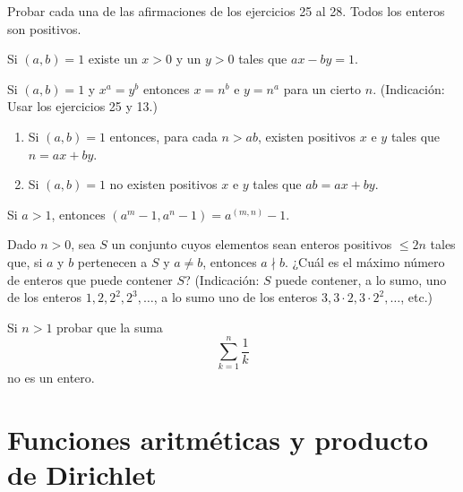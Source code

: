 \documentclass[12pt,a4paper]{book}
\begin{document}
    Probar cada una de las afirmaciones de los ejercicios 25 al 28. Todos los enteros son
    positivos.

    \begin{ejercicio}
        Si $(a,b)=1$ existe un $x>0$ y un $y>0$ tales que $ax-by=1$.
    \end{ejercicio}

    \begin{ejercicio}
        Si $(a,b)=1$ y $x^{a}=y^{b}$ entonces $x=n^{b}$ e $y=n^{a}$ para un cierto $n$.
        (Indicación: Usar los ejercicios 25 y 13.)
    \end{ejercicio}

    \begin{ejercicio}
        \begin{enumerate}
            \item[(a)] Si $(a,b)=1$ entonces, para cada $n>ab$, existen positivos $x$ e $y$
            tales que $n=ax+by$.
            \item[(b)] Si $(a,b)=1$ no existen positivos $x$ e $y$ tales que $ab=ax+by$.
        \end{enumerate}
    \end{ejercicio}

    \begin{ejercicio}
        Si $a>1$, entonces $(a^{m}-1,a^{n}-1)=a^{(m,n)}-1$.
    \end{ejercicio}

    \begin{ejercicio}
        Dado $n>0$, sea $S$ un conjunto cuyos elementos sean enteros positivos $\leq2n$
        tales que, si $a$ y $b$ pertenecen a $S$ y $a\neq b$, entonces $a\nmid b$. ¿Cuál es
        el máximo número de enteros que puede contener $S$? (Indicación: $S$ puede contener,
        a lo sumo, uno de los enteros $1,2,2^{2},2^{3},\dots$, a lo sumo uno de los enteros
        $3,3\cdot2,3\cdot2^{2},\dots$, etc.)
    \end{ejercicio}

    \begin{ejercicio}
        Si $n>1$ probar que la suma
        \begin{equation*}
            \sum_{k=1}^{n}\frac{1}{k}
        \end{equation*}
        no es un entero.
    \end{ejercicio}

\chapter{Funciones aritméticas y producto de Dirichlet}
\end{document}
